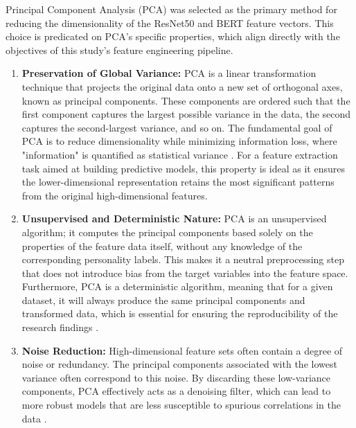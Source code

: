 Principal Component Analysis (PCA) was selected as the primary method for reducing the dimensionality of the ResNet50 and BERT feature vectors. This choice is predicated on PCA's specific properties, which align directly with the objectives of this study's feature engineering pipeline.
\begin{enumerate}
	\item \textbf{Preservation of Global Variance:} PCA is a linear transformation technique that projects the original data onto a new set of orthogonal axes, known as principal components. These components are ordered such that the first component captures the largest possible variance in the data, the second captures the second-largest variance, and so on. The fundamental goal of PCA is to reduce dimensionality while minimizing information loss, where "information" is quantified as statistical variance \citep{jolliffe2016}. For a feature extraction task aimed at building predictive models, this property is ideal as it ensures the lower-dimensional representation retains the most significant patterns from the original high-dimensional features.
	
	\item \textbf{Unsupervised and Deterministic Nature:} PCA is an unsupervised algorithm; it computes the principal components based solely on the properties of the feature data itself, without any knowledge of the corresponding personality labels. This makes it a neutral preprocessing step that does not introduce bias from the target variables into the feature space. Furthermore, PCA is a deterministic algorithm, meaning that for a given dataset, it will always produce the same principal components and transformed data, which is essential for ensuring the reproducibility of the research findings \citep{wold1987}.
	
	\item \textbf{Noise Reduction:} High-dimensional feature sets often contain a degree of noise or redundancy. The principal components associated with the lowest variance often correspond to this noise. By discarding these low-variance components, PCA effectively acts as a denoising filter, which can lead to more robust models that are less susceptible to spurious correlations in the data \citep{hastie2009}.
\end{enumerate}

